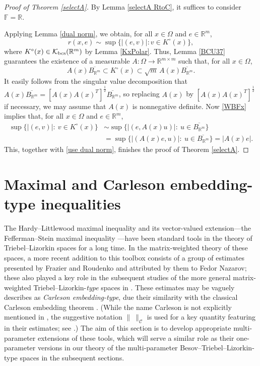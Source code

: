 \documentclass[11pt, reqno]{amsart}
\theoremstyle{definition}
\theoremstyle{remark}
\numberwithin{equation}{section}
\newcommand{\F}{\mathbb F}
\newcommand{\R}{\mathbb R}
\newcommand{\abs}[1]{|#1|}
\newcommand{\Norm}[2]{\|#1\|_{#2}}
\begin{document}
\begin{proof}[Proof of Theorem \ref{selectA}]
By Lemma \ref{selectA RtoC},
it suffices to consider $\F=\R$.

Applying Lemma \ref{dual norm}, we obtain,
for all $x\in\Omega$ and $e\in\mathbb R^m$,
\begin{equation}\label{use dual norm}
r(x,e)\sim\sup\{\abs{(e,v)}: v\in K^\circ(x)\},
\end{equation}
where $K^\circ(x)\in\mathcal K_{\rm{bcs}}(\R^m)$ by Lemma \ref{KxPolar}.
Thus, Lemma \ref{BCU37} guarantees the existence of a measurable
$A: \Omega\to\R^{m\times m}$ such that,
for all $x\in\Omega$,
\begin{equation}\label{WBFx}
A(x)\overline{B_{\R^m}}\subset K^\circ(x)
\subset \sqrt{m}\,A(x)\overline{B_{\R^m}}.
\end{equation}
It easily follows from
the singular value decomposition that
$A(x)\overline{B_{\R^m}}=[A(x)A(x)^T]^{\frac12}\overline{B_{\R^m}}$,
so replacing $A(x)$ by $[A(x)A(x)^T]^{\frac12}$ if necessary,
we may assume that $A(x)$ is nonnegative definite.
Now \eqref{WBFx} implies that,
for all $x\in\Omega$ and $e\in\mathbb R^m$,
\begin{align*}
\sup\{\abs{(e,v)}:\ v\in K^\circ(x)\}
&\sim\sup\Big\{\abs{(e,A(x)u)}:\ u\in \overline{B_{\R^m}} \Big\} \\
&=\sup\Big\{\abs{(A(x)e,u)}:\ u\in \overline{B_{\R^m}} \Big\}
=\abs{A(x)e}.
\end{align*}
This, together with \eqref{use dual norm},
finishes the proof of Theorem \ref{selectA}.
\end{proof}




\section{Maximal and Carleson embedding-type inequalities} \label{sec:max and cal}

The Hardy--Littlewood maximal inequality and its vector-valued extension---the Fefferman--Stein maximal inequality \cite{FS71}---have been standard tools in the theory of Triebel--Lizorkin spaces for a long time. In the matrix-weighted theory of these spaces, a more recent addition to this toolbox consists of a group of estimates presented by Frazier and Roudenko \cite[Theorem 3.7]{FR21} and attributed by them to Fedor Nazarov; these also played a key role in the subsequent studies of the more general matrix-weighted Triebel--Lizorkin-{\em type} spaces in \cite{BHYY:1a,BHYY:2b}. These estimates may be vaguely describes as {\em Carleson embedding-type}, due their similarity with the classical Carleson embedding theorem \cite{Car62}. (While the name Carleson is not explicitly mentioned in \cite{FR21}, the suggestive notation $\Norm{\ }{\mathcal C}$ is used for a key quantity featuring in their estimates; see \cite[Lemma 3.6]{FR21}.)
The aim of this section is to develop appropriate multi-parameter extensions of these tools, which will serve a similar role as their one-parameter versions in our theory of the multi-parameter Besov--Triebel--Lizorkin-type spaces in the subsequent sections.
\end{document}

